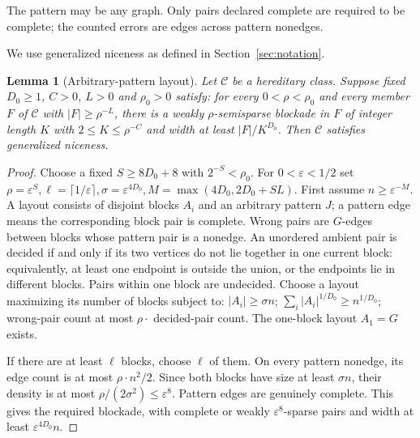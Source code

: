 \documentclass[11pt,a4paper]{article}
\newtheorem{lemma}[theorem]{Lemma}
\theoremstyle{definition}
\theoremstyle{remark}
\numberwithin{equation}{section}
\begin{document}
The pattern may be any graph. Only pairs declared complete are required to be complete; the counted errors are edges across pattern nonedges.

We use generalized niceness as defined in Section~\ref{sec:notation}.

\begin{lemma}[Arbitrary-pattern layout]\label{lem:layout}
Let \(\mathcal C\) be a hereditary class. Suppose fixed \(D_{0}\ge 1\), \(C>0\), \(L>0\) and \(\rho_{0}>0\) satisfy: for every \(0<\rho<\rho_{0}\) and every member \(F\) of \(\mathcal C\) with \(|F|\ge \rho^{-L}\), there is a weakly \(\rho\)-semisparse blockade in \(F\) of integer length \(K\) with \(2\le K\le \rho^{-C}\) and width at least \(|F|/K^{D_{0}}\). Then \(\mathcal C\) satisfies generalized niceness.
\end{lemma}
\begin{proof}
Choose a fixed \(S\ge\allowbreak 8D_{0}+8\) with \(2^{-S}<\rho_{0}\). For \(0<\varepsilon<1/2\) set \(\rho=\varepsilon^{S},\allowbreak  \ell=\lceil 1/\varepsilon\rceil,\allowbreak  \sigma=\varepsilon^{4D_{0}},\allowbreak  M=\max (4D_{0},\allowbreak 2D_{0}+S L)\). First assume \(n\ge\allowbreak \varepsilon^{-M}\). A layout consists of disjoint blocks \(A_{i}\) and an arbitrary pattern \(J\); a pattern edge means the corresponding block pair is complete. Wrong pairs are \(G\)-edges between blocks whose pattern pair is a nonedge. An unordered ambient pair is decided if and only if its two vertices do not lie together in one current block: equivalently, at least one endpoint is outside the union, or the endpoints lie in different blocks. Pairs within one block are undecided. Choose a layout maximizing its number of blocks subject to: \(|A_{i}|\ge\allowbreak \sigma n\); \(\sum _{i} |A_{i}|^{1/D_{0}}\ge\allowbreak n^{1/D_{0}}\); wrong-pair count at most \(\rho \cdot \) decided-pair count. The one-block layout \(A_{1}=G\) exists.

If there are at least \(\ell\) blocks, choose \(\ell\) of them. On every pattern nonedge, its edge count is at most \(\rho\cdot n^{2}/2\). Since both blocks have size at least \(\sigma n\), their density is at most \(\rho/(2\sigma^{2})\le\allowbreak \varepsilon^{8}\). Pattern edges are genuinely complete. This gives the required blockade, with complete or weakly \(\varepsilon^{8}\)-sparse pairs and width at least \(\varepsilon^{4D_{0}}n\).


\end{proof}
\end{document}
